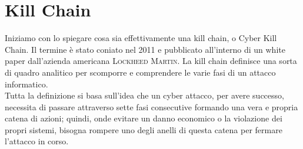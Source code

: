 \chapter{Kill Chain}
Iniziamo con lo spiegare cosa sia effettivamente una kill chain, o Cyber Kill Chain. Il termine è stato coniato nel 2011 e pubblicato all'interno di un white paper dall'azienda americana \textsc{Lockheed Martin}. La kill chain definisce una sorta di quadro analitico per scomporre e comprendere le varie fasi di un attacco informatico.\\
Tutta la definizione si basa sull'idea che un cyber attacco, per avere successo, necessita di passare attraverso sette fasi consecutive formando una vera e propria catena di azioni; quindi, onde evitare un danno economico o la violazione dei propri sistemi, bisogna rompere uno degli anelli di questa catena per fermare l'attacco in corso.\cite{cyber_kill_chain}

